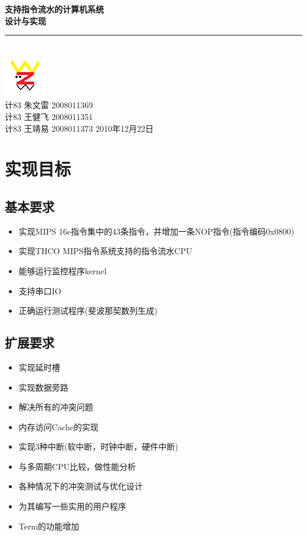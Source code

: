 \documentclass[10pt]{article}
\newcommand{\HRule}{\rule{\linewidth}{0.3mm}}
\begin{document}
\setlength{\parindent}{2em}
\begin{CJK}{UTF8}{gbsn}

\pagestyle{fancy}
\fancyhead{}
\rhead{\thepage}

\setlength{\topmargin}{3cm}
\begin{titlepage}
\begin{center}
{\huge \bfseries 支持指令流水的计算机系统\\设计与实现}\\
\HRule \\[0.4cm] 
\vspace{2cm}
\includegraphics{wzw.png}\\
\vspace{3cm}
{\large 计83{ }朱文雷{ }2008011369\\计83{ }王健飞{ }2008011351\\计83{ }王靖易{ }2008011373}
\vfill
{\large 2010年12月22日}
\end{center}
\end{titlepage}
\setlength{\topmargin}{0cm}

\newpage
\tableofcontents
\newpage

\section{实现目标}
\subsection{基本要求}
\begin{itemize}
\item 实现MIPS 16e指令集中的43条指令，并增加一条NOP指令(指令编码0x0800)
\item 实现THCO MIPS指令系统支持的指令流水CPU
\item 能够运行监控程序kernel
\item 支持串口IO
\item 正确运行测试程序(斐波那契数列生成)
\end{itemize}

\subsection{扩展要求}
\begin{itemize}
\item 实现延时槽
\item 实现数据旁路
\item 解决所有的冲突问题
\item 内存访问Cache的实现
\item 实现3种中断(软中断，时钟中断，硬件中断)
\item 与多周期CPU比较，做性能分析
\item 各种情况下的冲突测试与优化设计
\item 为其编写一些实用的用户程序
\item Term的功能增加
\end{itemize}


\end{CJK}
\end{document}
